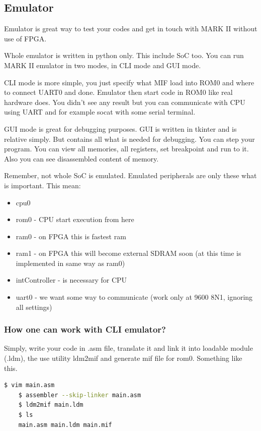 \subsection{Emulator}

Emulator is great way to test your codes and get in touch with MARK II without
use of FPGA.

Whole emulator is written in python only. This include SoC too. You can run
MARK II emulator in two modes, in CLI mode and GUI mode.

CLI mode is more simple, you just specify what MIF load into ROM0 and where to
connect UART0 and done. Emulator then start code in ROM0 like real hardware
does. You didn't see any result but you can communicate with CPU using UART and
for example socat with some serial terminal.

GUI mode is great for debugging purposes. GUI is written in tkinter and is
relative simply. But contains all what is needed for debugging. You can step
your program. You can view all memories, all registers, set breakpoint and run
to it. Also you can see disassembled content of memory.

Remember, not whole SoC is emulated. Emulated peripherals are only these what
is important. This mean:

\begin{itemize}
   \item cpu0
   \item rom0 - CPU start execution from here
   \item ram0 - on FPGA this is fastest ram
   \item ram1 - on FPGA this will become external SDRAM soon (at this time is implemented in same way as ram0)
   \item intController - is necessary for CPU
   \item uart0 - we want some way to communicate (work only at 9600 8N1, ignoring all settings)
\end{itemize}

\subsubsection{How one can work with CLI emulator?}

Simply, write your code in .asm file, translate it and link it into loadable
module (.ldm), the use utility ldm2mif and generate mif file for rom0.
Something like this.

\begin{lstlisting}[language=bash, frame=single]
    $ vim main.asm
    $ assembler --skip-linker main.asm
    $ ldm2mif main.ldm
    $ ls
    main.asm main.ldm main.mif
\end{lstlisting}

